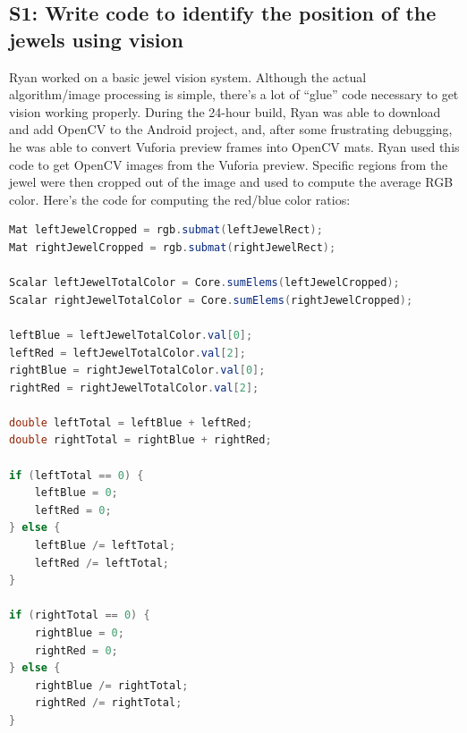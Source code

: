 \documentclass{article}
\begin{document}
\subsection{S1: Write code to identify the position of the jewels using vision}

Ryan worked on a basic jewel vision system. Although the actual algorithm/image processing is simple, there's a lot of ``glue'' code necessary to get vision working properly. During the 24-hour build, Ryan was able to download and add OpenCV to the Android project, and, after some frustrating debugging, he was able to convert Vuforia preview frames into OpenCV mats. Ryan used this code to get OpenCV images from the Vuforia preview. Specific regions from the jewel were then cropped out of the image and used to compute the average RGB color. Here's the code for computing the red/blue color ratios:
\begin{lstlisting}[language=Java]
Mat leftJewelCropped = rgb.submat(leftJewelRect);
Mat rightJewelCropped = rgb.submat(rightJewelRect);

Scalar leftJewelTotalColor = Core.sumElems(leftJewelCropped);
Scalar rightJewelTotalColor = Core.sumElems(rightJewelCropped);

leftBlue = leftJewelTotalColor.val[0];
leftRed = leftJewelTotalColor.val[2];
rightBlue = rightJewelTotalColor.val[0];
rightRed = rightJewelTotalColor.val[2];

double leftTotal = leftBlue + leftRed;
double rightTotal = rightBlue + rightRed;

if (leftTotal == 0) {
    leftBlue = 0;
    leftRed = 0;
} else {
    leftBlue /= leftTotal;
    leftRed /= leftTotal;
}

if (rightTotal == 0) {
    rightBlue = 0;
    rightRed = 0;
} else {
    rightBlue /= rightTotal;
    rightRed /= rightTotal;
}
\end{lstlisting}
\end{document}
